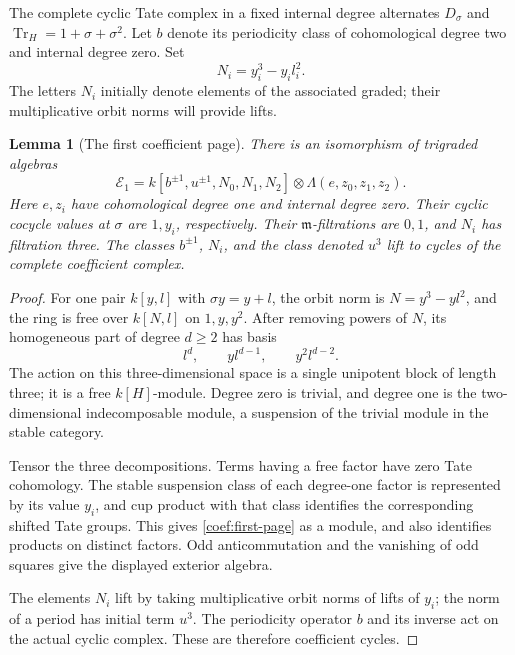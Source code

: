 \documentclass[11pt]{article}
\newtheorem{lemma}[theorem]{Lemma}
\theoremstyle{definition}
\theoremstyle{remark}
\numberwithin{equation}{section}
\begin{document}
The complete cyclic Tate complex in a fixed internal degree alternates
\(D_\sigma\) and \(\operatorname{Tr}_H=1+\sigma+\sigma^2\).  Let \(b\) denote its
periodicity class of cohomological degree two and internal degree zero.
Set
\[
 N_i=y_i^3-y_i l_i^2.
\]
The letters \(N_i\) initially denote elements of the associated graded;
their multiplicative orbit norms will provide lifts.

\begin{lemma}[The first coefficient page]\label{coef:graded-tate}
There is an isomorphism of trigraded algebras
\begin{equation}\label{coef:first-page}
 \mathcal E_1
 =k[b^{\pm1},u^{\pm1},N_0,N_1,N_2]
       \otimes\Lambda(e,z_0,z_1,z_2).
\end{equation}
Here \(e,z_i\) have cohomological degree one and internal degree zero.
Their cyclic cocycle values at \(\sigma\) are \(1,y_i\), respectively.
Their \(\mathfrak m\)-filtrations are \(0,1\), and \(N_i\) has filtration three.
The classes \(b^{\pm1}\), \(N_i\), and the class denoted \(u^3\) lift
to cycles of the complete coefficient complex.
\end{lemma}

\begin{proof}
For one pair \(k[y,l]\) with \(\sigma y=y+l\), the orbit norm is
\(N=y^3-yl^2\), and the ring is free over \(k[N,l]\) on \(1,y,y^2\).
After removing powers of \(N\), its homogeneous part of degree \(d\ge2\)
has basis
\[
 l^d,\qquad yl^{d-1},\qquad y^2l^{d-2}.
\]
The action on this three-dimensional space is a single unipotent block
of length three; it is a free \(k[H]\)-module.  Degree zero is trivial,
and degree one is the two-dimensional indecomposable module, a
suspension of the trivial module in the stable category.

Tensor the three decompositions.  Terms having a free factor have zero
Tate cohomology.  The stable suspension class of each degree-one factor
is represented by its value \(y_i\), and cup product with that class
identifies the corresponding shifted Tate groups.  This gives
\eqref{coef:first-page} as a module, and also identifies products on
distinct factors.  Odd anticommutation and the vanishing of odd
squares give the displayed exterior algebra.

The elements \(N_i\) lift by taking multiplicative orbit norms of
lifts of \(y_i\); the norm of a period has initial term \(u^3\).
The periodicity operator \(b\) and its inverse act on the actual cyclic
complex.  These are therefore coefficient cycles.
\end{proof}
\end{document}
